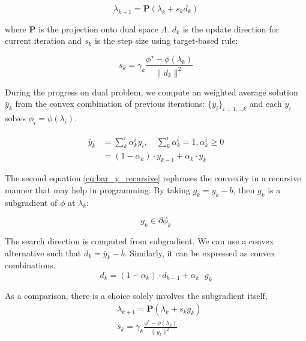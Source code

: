 \documentclass[../main]{subfiles}
\begin{document}
\begin{equation}\label{eq:main_subgrad}
  \lambda_{k+1} = \mathbf{P}(\lambda_{k} + s_{k}d_{k})
\end{equation}

where \(\mathbf P\) is the projection onto dual space \(\Lambda\).
\(d_k\) is the update direction for current iteration and \(s_{k}\) is
the step size using target-based rule:

\begin{equation}\label{eq:step_size}
  s_{k} = \gamma_k\frac{\phi^\star - \phi(\lambda_k)}{\|d_{k}\|^2}
\end{equation}


During the progress on dual problem,
we compute an weighted average solution \(\bar y_k\) from the convex combination of previous iterations:
\(\{y_i\}_{i=1,...k}\) and each \(y_i\) solves \(\phi_i = \phi(\lambda_i)\).

\begin{align}
  \label{eq:bar_y_average} \bar y_k & = \sum^i_k \alpha^i_k y_i,\quad  \sum^i_k \alpha^i_k = 1, \alpha^i_k \ge 0 \\
  \label{eq:bar_y_recursive}        & = (1-\alpha_k)\cdot\bar y_{k-1} + \alpha_k \cdot y_k
\end{align}

The second equation \eqref{eq:bar_y_recursive} rephrases the convexity in a recursive manner that may help in programming.
By taking \(g_k= y_k - b\), then \(g_k\) is a subgradient
of \(\phi\) at \(\lambda_k\):

\begin{equation}g_k \in \partial \phi_k\end{equation}


The search direction is computed from subgradient.
We can use a convex alternative such that \(d_k = \bar y_k - b\).
Similarly, it can be expressed as convex combinations.
\begin{equation}\label{eq:direction_recursive}
  d_k = (1-\alpha_k) \cdot d_{k-1} + \alpha_k\cdot g_k
\end{equation}

As a comparison, there is a choice solely involves the subgradient itself,
\begin{equation}\label{eq:simple_subgrad}
  \begin{aligned}
     & \lambda_{k+1} = \mathbf{P}(\lambda_{k} + s_{k}g_{k})             \\
     & s_{k} = \gamma_k\frac{\phi^\star - \phi(\lambda_k)}{\|g_{k}\|^2}
  \end{aligned}
\end{equation}
\end{document}

